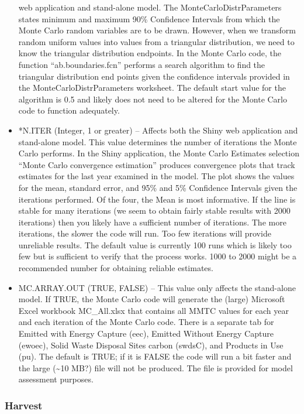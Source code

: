 \documentclass[
  openany]{book}
\begin{document}
\begin{itemize}
  web application and stand-alone model. The MonteCarloDistrParameters
  states minimum and maximum 90\% Confidence Intervals from which the
  Monte Carlo random variables are to be drawn. However, when we
  transform random uniform values into values from a triangular
  distribution, we need to know the triangular distribution endpoints.
  In the Monte Carlo code, the function ``ab.boundaries.fcn'' performs a
  search algorithm to find the triangular distribution end points given
  the confidence intervals provided in the MonteCarloDistrParameters
  worksheet. The default start value for the algorithm is 0.5 and likely
  does not need to be altered for the Monte Carlo code to function
  adequately.
\item
  *N.ITER (Integer, 1 or greater) -- Affects both the Shiny web
  application and stand-alone model. This value determines the number of
  iterations the Monte Carlo performs. In the Shiny application, the
  Monte Carlo Estimates selection ``Monte Carlo convergence estimation''
  produces convergence plots that track estimates for the last year
  examined in the model. The plot shows the values for the mean,
  standard error, and 95\% and 5\% Confidence Intervals given the
  iterations performed. Of the four, the Mean is most informative. If
  the line is stable for many iterations (we seem to obtain fairly
  stable results with 2000 iterations) then you likely have a sufficient
  number of iterations. The more iterations, the slower the code will
  run. Too few iterations will provide unreliable results. The default
  value is currently 100 runs which is likely too few but is sufficient
  to verify that the process works. 1000 to 2000 might be a recommended
  number for obtaining reliable estimates.
\item
  MC.ARRAY.OUT (TRUE, FALSE) -- This value only affects the stand-alone
  model. If TRUE, the Monte Carlo code will generate the (large)
  Microsoft Excel workbook MC\_All.xlsx that contains all MMTC values
  for each year and each iteration of the Monte Carlo code. There is a
  separate tab for Emitted with Energy Capture (eec), Emitted Without
  Energy Capture (ewoec), Solid Waste Disposal Sites carbon (swdsC), and
  Products in Use (pu). The default is TRUE; if it is FALSE the code
  will run a bit faster and the large (\textasciitilde10 MB?) file will
  not be produced. The file is provided for model assessment purposes.
\end{itemize}

\hypertarget{own-prov-input-harvest}{%
\subsubsection{Harvest}\label{own-prov-input-harvest}}
\end{document}
